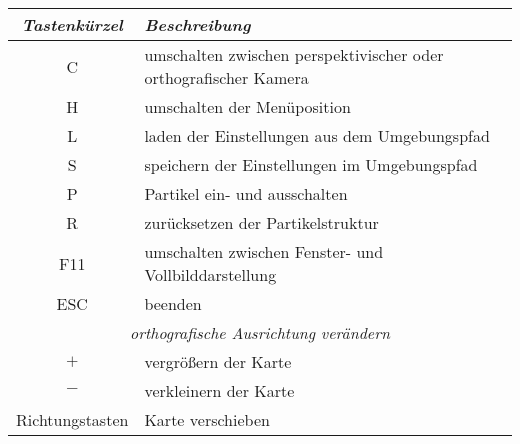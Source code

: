 \begin{Spacing}{\mylinespace}
\begin{table}[htdp]
\begin{center}
\begin{tabular}{| c | p{9cm} |}
	\hline
	\textit{Tastenkürzel} & \textit{Beschreibung} \\
	\hline \hline
		C & umschalten zwischen perspektivischer oder orthografischer Kamera \\
	\hline
		H & umschalten der Menüposition \\
	\hline
		L & laden der Einstellungen aus dem Umgebungspfad \\
	\hline
		S & speichern der Einstellungen im Umgebungspfad \\
	\hline
		P & Partikel ein- und ausschalten \\
	\hline
		R & zurücksetzen der Partikelstruktur \\
	\hline
		F11 & umschalten zwischen Fenster- und Vollbilddarstellung \\
	\hline
		ESC & beenden \\
	\hline
	\hline
	\multicolumn{2}{|c|}{\textit{orthografische Ausrichtung verändern}} \\
	\hline
		$+$  & vergrößern der Karte \\
	\hline
		$-$ & verkleinern der Karte \\
	\hline
		Richtungstasten & Karte verschieben \\
	\hline
\end{tabular}
\end{center}
\label{default}
\end{table}%

\end{Spacing}
\newpage
\clearpage
